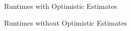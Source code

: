 \documentclass{article}
\begin{document}
    \begin{preview}
        Runtimes with Optimistic Estimates
    \end{preview}

    \begin{preview}
        
    \end{preview}

    \begin{preview}
        Runtimes without Optimistic Estimates
    \end{preview}

    \begin{preview}
        
    \end{preview}
\end{document}
